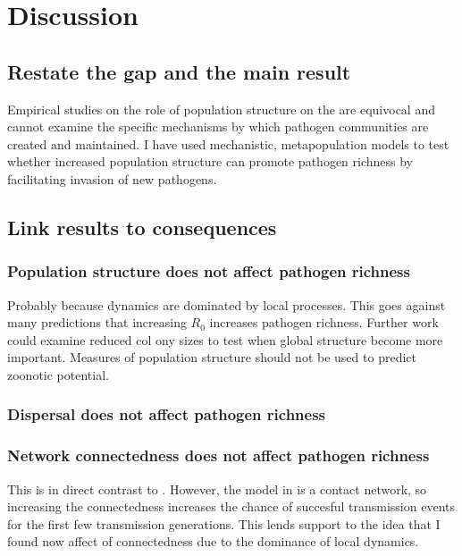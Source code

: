 \clearpage
\section{Discussion}


\subsection{Restate the gap and the main result}

Empirical studies on the role of population structure on the are equivocal and cannot examine the specific mechanisms by which pathogen communities are created and maintained.
I have used mechanistic, metapopulation models to test whether increased population structure can promote pathogen richness by facilitating invasion of new pathogens.



\subsection{Link results to consequences}

\subsubsection{Population structure does not affect pathogen richness}

Probably because dynamics are dominated by local processes.
This goes against many predictions that increasing $R_0$ increases pathogen richness.
Further work could examine reduced col  ony sizes to test when global structure become more important.
Measures of population structure should not be used to predict zoonotic potential.

\subsubsection{Dispersal does not affect pathogen richness}



\subsubsection{Network connectedness does not affect pathogen richness}

This is in direct contrast to \cite{campos2006pathogen}. 
However, the model in \cite{campos2006pathogen} is a contact network, so increasing the connectedness increases the chance of succesful transmission events for the first few transmission generations.
This lends support to the idea that I found now affect of connectedness due to the dominance of local dynamics.

